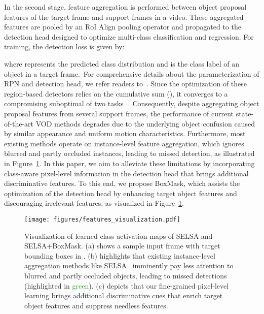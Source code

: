 \documentclass[10pt,twocolumn,letterpaper]{article}
\begin{document}
In the second stage, feature aggregation is performed between object proposal features of the target frame and support frames in a video. These aggregated features are pooled by an RoI Align pooling operator and propagated to the detection head designed to optimize multi-class classification and regression. For training, the detection loss is given by:

where  represents the predicted class distribution and  is the class label of an object in a target frame.~For comprehensive details about the parameterization of RPN and detection head, we refer readers to~\cite{ren2015faster}. Since the optimization of these region-based detectors relies on the cumulative sum (), it converges to a compromising suboptimal of two tasks~\cite{cheng2018revisiting}.~Consequently, despite aggregating object proposal features from several support frames, the performance of current state-of-the-art VOD methods degrades due to the underlying object confusion caused by similar appearance and uniform motion characteristics. Furthermore, most existing methods operate on instance-level feature aggregation, which ignores blurred and partly occluded instances, leading to missed detection, as illustrated in Figure~\ref{fig:feature_vis}\color{red}{(b)}\color{black}. In this paper, we aim to alleviate these limitations by incorporating class-aware pixel-level information in the detection head that brings additional discriminative features. To this end, we propose BoxMask, which assists the optimization of the detection head by enhancing target object features and discouraging irrelevant features, as visualized in Figure~\ref{fig:feature_vis}\color{red}{(c)}\color{black}.

\begin{figure}
\centering
\texttt{[image: figures/features\_visualization.pdf]}
\caption{Visualization of learned class activation maps of SELSA and SELSA+BoxMask. (a) shows a sample input frame with target bounding boxes in \color{red}{red}\color{black}. (b) highlights that existing instance-level aggregation methods like SELSA~\cite{wu2019sequence} imminently pay less attention to blurred and partly occluded objects, leading to missed detections (highlighted in \textcolor{ForestGreen}{green}\color{black}). (c) depicts that our fine-grained pixel-level learning brings additional discriminative cues that enrich target object features and suppress needless features.}
\label{fig:feature_vis}
\vspace{-10pt}
\end{figure}
\end{document}
